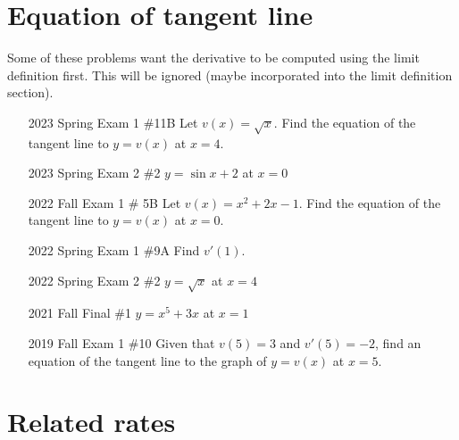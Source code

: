 \documentclass[10pt]{scrartcl}
\theoremstyle{definition}
\begin{document}
\section{Equation of tangent line}
Some of these problems want the derivative to be computed using the limit definition first.
This will be ignored (maybe incorporated into the limit definition section).
\begin{enumerate}
\item [2023 Spring Exam 1 \#11B] Let $v(x) = \sqrt{x}$. Find the equation of the tangent line to $y=v(x)$ at $x=4$.
\item [2023 Spring Exam 2 \#2] $y=\sin x + 2$ at $x=0$
\item [2022 Fall Exam 1 \# 5B] Let $v(x) = x^2+2x-1$. Find the equation of the tangent line to $y=v(x)$ at $x=0$.
\item [2022 Spring Exam 1 \#9A] Find $v'(1)$.
\item [2022 Spring Exam 2 \#2] $y = \sqrt x$ at $x=4$
\item [2021 Fall Final \#1] $y=x^5+3x$ at $x=1$
\item [2019 Fall Exam 1 \#10] Given that $v(5) = 3$ and $v'(5) = -2$, find an equation of the tangent line to the graph of $y = v(x)$ at $x=5$.
\end{enumerate}

\section{Related rates}
\textbf{\color{red}{Always include units!}}
\end{document}
